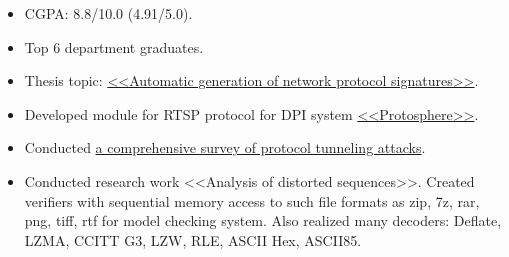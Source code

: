 \documentclass[10pt,a4paper,normalphoto]{altacv}
\begin{document}

\begin{fullwidth}
\makecvheader
\end{fullwidth}




\begin{itemize}
    \item CGPA: 8.8/10.0 (4.91/5.0).
    \item Top 6 department graduates.
    \item Thesis topic: \href{https://github.com/Panterrich/AutoSignatureGenerator}{<<Automatic generation of network protocol signatures>>}.
\end{itemize}

\medskip


\divider


\begin{itemize}
\item Developed module for RTSP protocol for DPI system \href{https://www.ispras.ru/en/technologies/protosphere/}{<<Protosphere>>}.
\item Conducted \href{https://github.com/Panterrich/FTE/blob/master/fte.pdf}{a comprehensive survey of protocol tunneling attacks}.
\item Conducted research work <<Analysis of distorted sequences>>.
Created verifiers with sequential memory access to such file formats as zip, 7z, rar, png, tiff, rtf for model checking system.
Also realized many decoders: Deflate, LZMA, CCITT G3, LZW, RLE, ASCII Hex, ASCII85.
\end{itemize}
\end{document}
